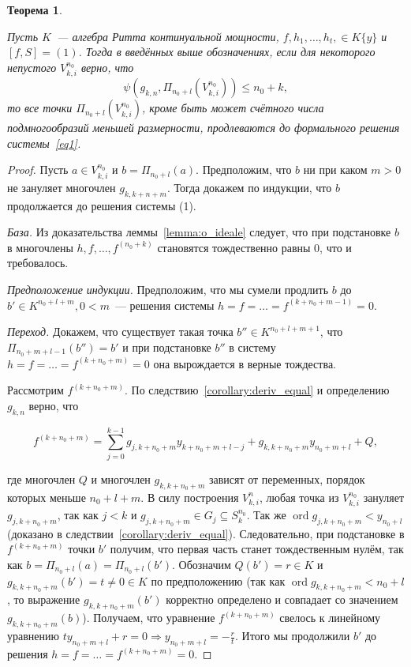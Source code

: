 \documentclass[16pt]{article}
\DeclareMathOperator{\ord}{ord}
\renewcommand{\le}{\leqslant} %
\theoremstyle{plain1}
\theoremstyle{plain2}
\theoremstyle{plain}
\newtheorem{theorem}{Теорема}
\theoremstyle{plain3}
\theoremstyle{definition}
\theoremstyle{remark}
\begin{document}
\begin{theorem}\label{theorem:general th1}

Пусть $K$~--- алгебра Ритта континуальной мощности, $f,h_1,\ldots,h_t,\in K\{y\}$ и $[f,S]=(1)$. Тогда в введённых выше обозначениях, если для некоторого непустого ${V}_{k,i}^{n_0}$ верно, что
\begin{equation}
\psi(g_{k,n},\Pi_{n_0+l}({V}_{k,i}^{n_0}))\le n_0+k,
\end{equation}
то все точки $\Pi_{n_0+l}({V}_{k,i}^{n_0})$, кроме быть может счётного числа подмногообразий меньшей размерности, продлеваются до формального решения системы~\eqref{eq1}.
\end{theorem}

\begin{proof}
Пусть $a\in {V}_{k,i}^{n_0}$ и $b=\Pi_{n_0+l}(a)$. Предположим, что $b$ ни при каком $m>0$ не зануляет многочлен $g_{k,k+n+m}$. Тогда докажем по индукции, что $b$ продолжается до решения системы (1).

\emph{База.} Из доказательства леммы~\ref{lemma:o_ideale} следует, что при подстановке $b$ в многочлены $h,f,\ldots,f^{(n_0+k)}$ становятся тождественно равны 0, что и требовалось.

\emph{Предположение индукции.} Предположим, что мы сумели продлить $b$ до $b'\in K^{n_0+l+m}, 0< m$~--- решения системы $h=f=\ldots=f^{(k+n_0+m-1)}=0$.

\emph{Переход.} Докажем, что существует такая точка $b''\in K^{n_0+l+m+1}$, что $\Pi_{n_0+m+l-1}(b'')=b'$ и при подстановке $b''$ в систему $h=f=\ldots=f^{(k+n_0+m)}=0$ она вырождается в верные тождества.

Рассмотрим $f^{(k+n_0+m)}$. По следствию~\ref{corollary:deriv_equal} и определению $g_{k,n}$ верно, что

$$
f^{(k+n_0+m)}=\sum\limits_{j=0}^{k-1} g_{j,k+n_0+m}y_{k+n_0+m+l -j}+g_{k,k+n_0+m}y_{n_0+m+l}  + Q,
$$

где многочлен $Q$ и многочлен $g_{k,k+n_0+m}$ зависят от переменных, порядок которых меньше $n_0+l+m$. В силу построения ${V}_{k,i}^n$, любая точка из ${V}_{k,i}^{n_0}$ зануляет $g_{j,k+n_0+m}$, так как $j < k$ и $g_{j,k+n_0+m}\in G_j\subseteq S_k^{n_0}$. Так же $\ord g_{j,k+n_0+m}<y_{n_0+l}$ (доказано в следствии~\ref{corollary:deriv_equal}). Следовательно, при подстановке в $f^{(k+n_0+m)}$ точки $b'$ получим, что первая часть станет тождественным нулём, так как $b=\Pi_{n_0+l}(a)=\Pi_{n_0+l}(b')$. Обозначим $Q(b')=r\in K$ и $g_{k,k+n_0+m}(b')=t\neq 0\in K$ по предположению (так как $\ord g_{k,k+n_0+m}< n_0+l$, то выражение $g_{k,k+n_0+m}(b')$ корректно определено и совпадает со значением $g_{k,k+n_0+m}(b)$). Получаем, что уравнение $f^{(k+n_0+m)}$ свелось к линейному уравнению $t y_{n_0+m+l}+r=0\Rightarrow y_{n_0+m+l}=-\frac{r}{t}$. Итого мы продолжили $b'$ до решения $h=f=\ldots=f^{(k+n_0+m)}=0$.


\end{proof}
\end{document}
